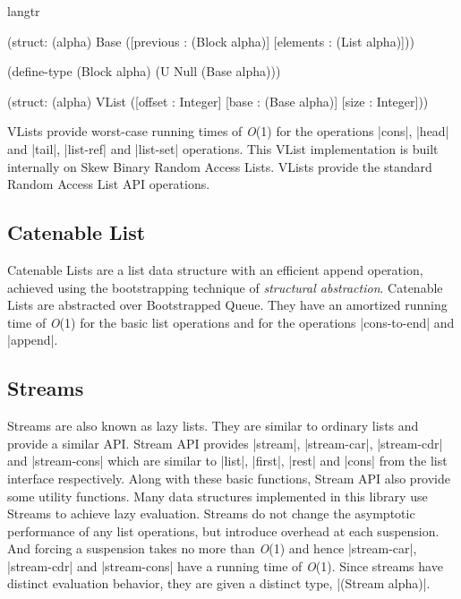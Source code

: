% 

\begin{datastructure}
  \begin{schemedisplay}
    langtr

    (struct: (alpha) Base
      ([previous : (Block alpha)]
       [elements : (List alpha)]))

    (define-type (Block alpha) (U Null (Base alpha)))

    (struct: (alpha) VList
      ([offset : Integer]
       [base   : (Base alpha)]
       [size    : Integer]))

  \end{schemedisplay}
  \label{ds:10}
\end{datastructure}

\noindent
VLists provide worst-case running times of \emph{O}(1) for the
operations \scheme|cons|, \scheme|head| and \scheme|tail|,
\scheme|list-ref| and \scheme|list-set| operations. This VList
implementation is built internally on Skew Binary Random Access
Lists. VLists provide the standard Random Access List API operations.

\subsection*{Catenable List}
Catenable Lists \citep{catenable} are a list data structure with an
efficient append operation, achieved using the bootstrapping technique
of \emph{structural abstraction}. Catenable Lists are abstracted over
Bootstrapped Queue. They have an amortized running time of \emph{O}(1)
for the basic list operations and for the operations
\scheme|cons-to-end| and \scheme|append|.

\subsection*{Streams}
\label{stream}
Streams \citep{oka} are also known as lazy lists. They are similar to
ordinary lists and provide a similar API. Stream API provides
\scheme|stream|, \scheme|stream-car|, \scheme|stream-cdr| and
\scheme|stream-cons| which are similar to \scheme|list|, \scheme|first|,
\scheme|rest| and \scheme|cons| from the list interface
respectively. Along with these basic functions, Stream API also provide
some utility functions. Many data structures implemented in this library
use Streams to achieve lazy evaluation. Streams do not change the
asymptotic performance of any list operations, but introduce overhead at
each suspension. And forcing a suspension takes no more than \emph{O}(1)
and hence \scheme|stream-car|, \scheme|stream-cdr| and
\scheme|stream-cons| have a running time of \emph{O}(1). Since streams
have distinct evaluation behavior, they are given a distinct type,
\scheme|(Stream alpha)|.


